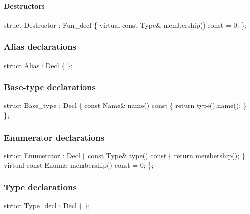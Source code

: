 \documentclass[letter,11pt]{article}
\begin{document}
\paragraph{Destructors}

\begin{Program}
   struct Destructor : Fun_decl \{
      virtual const Type& membership() const = 0;
   \};
\end{Program}


\subsubsection{Alias declarations}
\begin{Program}
   struct Alias : Decl \{
   \};
\end{Program}



\subsubsection{Base-type declarations}
\begin{Program}
   struct Base_type : Decl \{
      const Name& name() const \{ return type().name(); \}
   \};
\end{Program}


\subsubsection{Enumerator declarations}

\begin{Program}
   struct Enumerator : Decl \{
      const Type& type() const \{ return membership(); \}
      virtual const Enum& membership() const = 0;
   \};
\end{Program}



\subsubsection{Type declarations}

\begin{Program}
   struct Type_decl : Decl \{
   \};
\end{Program}
\end{document}

